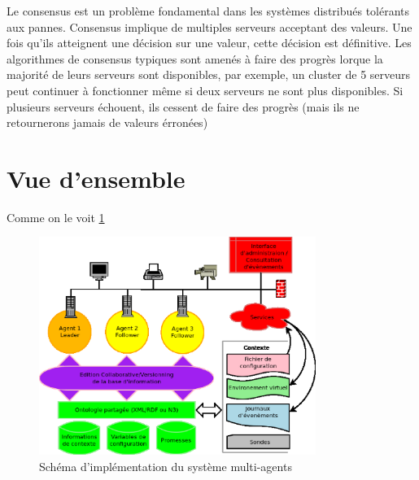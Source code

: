 Le consensus est un problème fondamental dans les systèmes distribués tolérants
aux pannes. Consensus implique de multiples serveurs acceptant des valeurs. Une
fois qu'ils atteignent une décision sur une valeur, cette décision est
définitive. Les algorithmes de consensus typiques  sont amenés à faire des
progrès lorque la majorité de leurs serveurs sont disponibles, par exemple, un
cluster de 5 serveurs peut continuer à fonctionner même si deux serveurs ne sont
plus disponibles. Si plusieurs serveurs échouent, ils cessent de faire des
progrès (mais ils ne retournerons jamais de valeurs érronées)

\section{Vue d'ensemble}

Comme on le voit \ref{archi}

\begin{figure}[ht!]
  \centering
  \includegraphics[width=90mm]{img/archi}
  \caption{Schéma d'implémentation du système multi-agents}
  \label{archi}
\end{figure}
